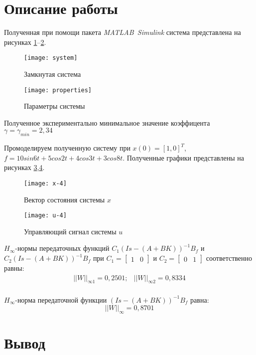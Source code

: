 \documentclass[14pt, a4paper]{extarticle}
\begin{document}
	\newpage
	
	\section*{Описание работы}
	
	Полученная при помощи пакета \textit{MATLAB~Simulink} система представлена на рисунках \ref{fig:system}--\ref{fig:properties}.
	
	\begin{figure}[H]
		\centering
		\texttt{[image: system]}
		\caption{Замкнутая система}
		\label{fig:system}
	\end{figure}
	
	\begin{figure}[H]
		\centering
		\texttt{[image: properties]}
		\caption{Параметры системы}
		\label{fig:properties}
	\end{figure}
	
	Полученное экспериментально минимальное значение коэффицента $\gamma=\gamma_{min}=2,34$
	
	Промоделируем полученную систему при $x(0)=[1,0]^T$, $f=10sin6t+5cos2t+4cos3t+3cos8t$. Полученные графики представлены на рисунках \ref{fig:x-4},\ref{fig:u-4}.
	
	\begin{figure}[H]
		\centering
		\texttt{[image: x-4]}
		\caption{Вектор состояния системы $x$}
		\label{fig:x-4}
	\end{figure}
	
	\begin{figure}[H]
		\centering
		\texttt{[image: u-4]}
		\caption{Управляющий сигнал системы $u$}
		\label{fig:u-4}
	\end{figure}
	
	$H_\infty$-нормы передаточных функций $C_1(Is-(A+BK))^{-1}B_f$ и $C_2(Is-(A+BK))^{-1}B_f$ при $C_1=\left[\begin{matrix}1 & 0\end{matrix}\right]$ и $C_2=\left[\begin{matrix}0 & 1\end{matrix}\right]$ соответственно равны:
	$$\begin{matrix}
		\left|\left|W\right|\right|_{\infty1} = 0,2501; & \left|\left|W\right|\right|_{\infty2} = 0,8334 \\
	\end{matrix}$$
	
	$H_\infty$-норма передаточной функции $(Is-(A+BK))^{-1}B_f$ равна:
	$$\left|\left|W\right|\right|_\infty=0,8701$$
	\newpage
	
	\section*{Вывод}
	

	
\end{document}
